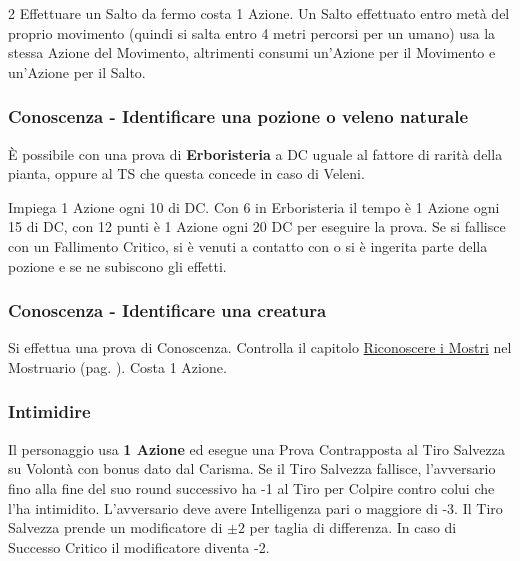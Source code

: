 \begin{multicols}{2}
Effettuare un Salto da fermo costa 1 Azione. Un Salto effettuato entro metà del proprio movimento (quindi si salta entro 4 metri percorsi per un umano) usa la stessa Azione del Movimento, altrimenti consumi un'Azione per il Movimento e un'Azione per il Salto.

\titlespacing*{\subsubsection}{0pt}{0.5em}{0.5em}\subsubsection*{Conoscenza - Identificare una pozione o veleno naturale} \label{identificarepozioni}
È possibile con una prova di \textbf{Erboristeria} a DC uguale al fattore di rarità della pianta, oppure al TS che questa concede in caso di Veleni.

Impiega 1 Azione ogni 10 di DC. Con 6 in Erboristeria il tempo è 1 Azione ogni 15 di DC, con 12 punti è 1 Azione ogni 20 DC per eseguire la prova. Se si fallisce con un Fallimento Critico, si è venuti a contatto con o si è ingerita parte della pozione e se ne subiscono gli effetti.

\titlespacing*{\subsubsection}{0pt}{0.5em}{0.5em}\subsubsection*{Conoscenza - Identificare una creatura} \label{riconosceremostro}\hypertarget{riconosceremostro}{}
Si effettua una prova di Conoscenza. Controlla il capitolo \hyperlink{riconoscereimostri}{Riconoscere i Mostri} nel Mostruario (pag. \pageref{riconoscereimostri}). Costa 1 Azione.

\titlespacing*{\subsubsection}{0pt}{0.5em}{0.5em}\subsubsection*{Intimidire}\label{intimidire}
Il personaggio usa \textbf{1 Azione} ed esegue una Prova Contrapposta al Tiro Salvezza su Volontà con bonus dato dal Carisma.
Se il Tiro Salvezza fallisce, l'avversario fino alla fine del suo round successivo ha -1 al Tiro per Colpire contro colui che l'ha intimidito. L'avversario deve avere Intelligenza pari o maggiore di -3. Il Tiro Salvezza prende un modificatore di $\pm2$ per taglia di differenza. In caso di Successo Critico il modificatore diventa -2.


\end{multicols}
